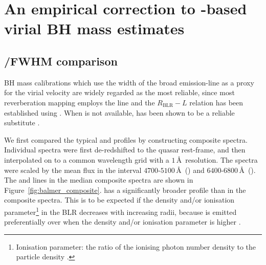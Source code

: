 \section{An empirical correction to -based virial BH mass estimates}

\subsection{\hans/\hb FWHM comparison}
\label{sec:hahbcomparison}

BH mass calibrations which use the width of the broad \hb emission-line as a proxy for the virial velocity are widely regarded as the most reliable, since most reverberation mapping employs the \hb line and the $R_{\text{BLR}}-L$ relation has been established using \hbns.
When \hb is not available, \ha has been shown to be a reliable substitute \citep[e.g.][]{greene05b,shen11,shen12}. 

We first compared the typical \ha and \hb profiles by constructing composite spectra. 
Individual spectra were first de-redshifted to the quasar rest-frame, and then interpolated on to a common wavelength grid with a $1$\,\AA\, resolution. 
The spectra were scaled by the mean flux in the interval $4700$-$5100$\,\AA\, (\hbns) and $6400$-$6800$\,\AA\, (\hans). 
The \ha and \hb lines in the median composite spectra are shown in Figure~\ref{fig:balmer_composite}.
\hb has a significantly broader profile than \ha in the composite spectra. 
This is to be expected if the density and/or ionisation parameter\footnote{Ionisation parameter: the ratio of the ionising photon number density to the particle density \citep[e.g.][]{peterson97}.} in the BLR decreases with increasing radii, because \hb is emitted preferentially over \ha when the density and/or ionisation parameter is higher \citep[e.g.][]{osterbrock89}. 

